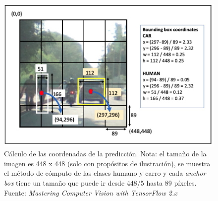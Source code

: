\begin{figure}[H]
    \centering
    \includegraphics{Recursos/grid_example.png}
    \caption[Cálculo de las coordenadas de la predicción. Nota: el tamaño de la imagen es 448 x 448 (solo con propósitos de ilustración), se muestra el método de cómputo de las clases humano y carro y cada \textit{anchor box} tiene un tamaño que puede ir desde 448/5 hasta 89 píxeles.]{Cálculo de las coordenadas de la predicción. Nota: el tamaño de la imagen es 448 x 448 (solo con propósitos de ilustración), se muestra el método de cómputo de las clases humano y carro y cada \textit{anchor box} tiene un tamaño que puede ir desde 448/5 hasta 89 píxeles. {\footnotesize Fuente: \textit{Mastering Computer Vision with TensorFlow 2.x} \cite[p~191]{Krishnendu}}}
    \label{exampleYOLO}
\end{figure}
